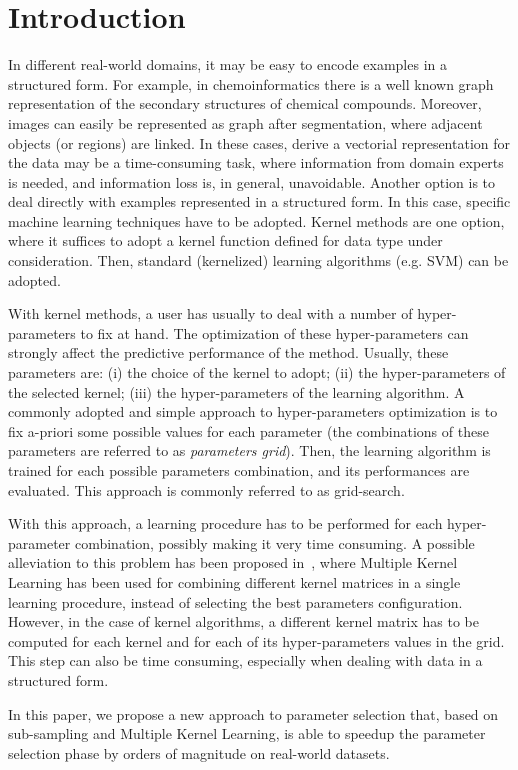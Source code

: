 \documentclass{esannV2}
\newcommand{\1}{{\bf 1}}
\begin{document}
\section{Introduction}
In different real-world domains, it may be easy to encode examples in a structured form. For example, in chemoinformatics there is a well known graph representation of the secondary structures of chemical compounds. Moreover, images can easily be represented as graph after segmentation, where adjacent objects (or regions) are linked.
In these cases, derive a vectorial representation for the data may be a time-consuming task, where information from  domain experts is needed, and information loss is, in general, unavoidable.
Another option is to deal directly with examples represented in a structured form.
In this case, specific machine learning techniques have to be adopted.
Kernel methods are one option, where it suffices to adopt a kernel function defined for data type under consideration. Then, standard (kernelized) learning algorithms (e.g. SVM) can be adopted.

With kernel methods, a user has usually to deal with a number of hyper-parameters to fix at hand. The optimization of these hyper-parameters can strongly affect the predictive performance of the method.
Usually, these parameters are: (i) the choice of the kernel to adopt; (ii) the hyper-parameters of the selected kernel; (iii) the hyper-parameters of the learning algorithm.
A commonly adopted and simple approach to hyper-parameters optimization is to fix a-priori some possible values for each parameter (the combinations of these parameters are referred to as \textit{parameters grid}).
Then, the learning algorithm is trained for each possible parameters combination, and its performances are evaluated. This approach is commonly referred to as grid-search.

With this approach, a learning procedure has to be performed for each hyper-parameter combination, possibly making it very time consuming.
A possible alleviation to this problem has been proposed in~\cite{Massimo2016}, where Multiple Kernel Learning has been used for combining different kernel matrices in a single learning procedure, instead of selecting the best parameters configuration.
However, in the case of kernel algorithms, a different kernel matrix has to be computed for each kernel and for each of its hyper-parameters values in the grid. This step can also be time consuming, especially when dealing with data in a structured form.

In this paper, we propose a new approach to parameter selection that, based on sub-sampling and Multiple Kernel Learning, is able to speedup the parameter selection phase by orders of magnitude on real-world datasets.
\end{document}
